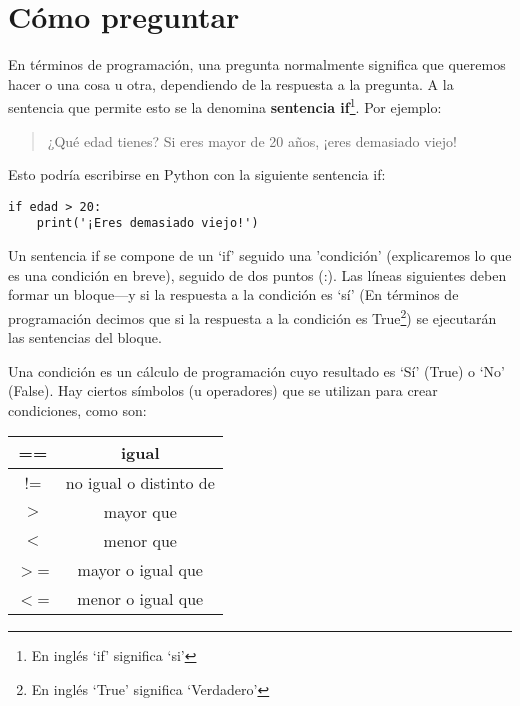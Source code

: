 

\chapter{Cómo preguntar}\label{ch:howtoaskaquestion}

En términos de programación, una pregunta normalmente significa que queremos hacer o una cosa u otra, dependiendo de la respuesta a la pregunta.  A la sentencia que permite esto se la denomina \textbf{sentencia if}\footnote{En inglés `if' significa `si'}.  Por ejemplo:

\begin{quotation}
¿Qué edad tienes?  Si eres mayor de 20 años, ¡eres demasiado viejo!
\end{quotation}

Esto podría escribirse en Python con la siguiente sentencia if:

\begin{listing}
\begin{verbatim}
if edad > 20:
    print('¡Eres demasiado viejo!')
\end{verbatim}
\end{listing}

Un sentencia if se compone de un `if' seguido una 'condición' (explicaremos lo que es una condición en breve), seguido de dos puntos (:).  Las líneas siguientes deben formar un bloque---y si la respuesta a la condición es `sí' (En términos de programación decimos que si la respuesta a la condición es True\footnote{En inglés `True' significa `Verdadero'}) se ejecutarán las sentencias del bloque.
\par
Una condición es un cálculo de programación cuyo resultado es `Sí' (True) o `No' (False).  Hay ciertos símbolos (u operadores) que se utilizan para crear condiciones, como son:

\begin{center}
\begin{tabular}{|c|c|}
\hline
== & igual \\
\hline
!= & no igual o distinto de \\
\hline
$>$ & mayor que \\
\hline
$<$ & menor que \\
\hline
$>$= & mayor o igual que \\
\hline
$<$= & menor o igual que \\
\hline
\end{tabular}
\end{center}

